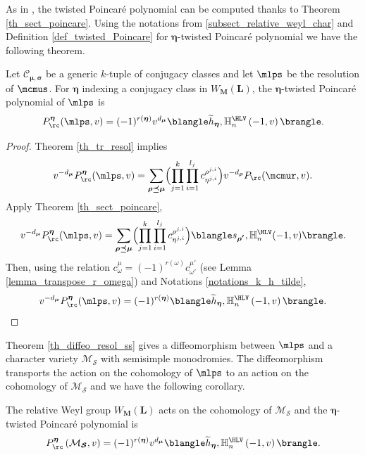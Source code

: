 As in \cite[Prop.\,1.9]{Letellier13}, the twisted Poincaré polynomial can be computed thanks to Theorem \ref{th_sect_poincare}. Using the notations from \ref{subsect_relative_weyl_char} and Definition \ref{def_twisted_Poincare} for $\boldsymbol{\eta}$-twisted Poincaré polynomial we have the following theorem.
\begin{theorem}\label{cor_twiste_Poincare_resol}
Let $\mathcal{C}_{\boldsymbol{\mu},\boldsymbol{\sigma}}$ be a generic $k$-tuple of conjugacy classes and let $\mlps$ be the resolution of $\mcmus$. For $\boldsymbol{\eta}$ indexing a conjugacy class in $W_{\boldsymbol{M}}(\boldsymbol{L})$, the $\boldsymbol{\eta}$-twisted Poincaré polynomial of $\mlps$ is
\[
P_{\rc}^{\boldsymbol{\eta}}(\mlps,v) = (-1)^{r(\boldsymbol{\eta})}v^{d_{\boldsymbol{\mu}}}\blangle \widetilde{h}_{\boldsymbol{\eta}},\mathbb{H}_n^{\HLV}\left(-1,v\right)\brangle.
\]
\end{theorem}
\begin{proof}
Theorem \ref{th_tr_resol} implies
\[
v^{-d_{\boldsymbol{\mu}}} P_{\rc}^{\boldsymbol{\eta}}(\mlps,v) = \sum_{\boldsymbol{\rho\preceq\mu}} \Bigl(\prod_{j=1}^k\prod_{i=1}^{l_j} c^{\rho^{j,i}}_{\eta^{j,i}}\Bigr) v^{-d_{\boldsymbol{\rho}}} P_{\rc}(\mcmur,v).
\]
Apply Theorem \ref{th_sect_poincare},
\begin{align*}
v^{-d_{\boldsymbol{\mu}}} P_{\rc}^{\boldsymbol{\eta}}(\mlps,v) = \sum_{\boldsymbol{\rho\preceq\mu}} \Bigl(\prod_{j=1}^k\prod_{i=1}^{l_j} c^{\rho^{j,i}}_{\eta^{j,i}}\Bigr)\blangle s_{\boldsymbol{\rho'}}, \mathbb{H}_n^{\HLV}(-1,v)\brangle.
\end{align*}
Then, using the relation $c_{\omega}^{\mu}=(-1)^{r(\omega)} c_{\omega'}^{\mu'}$ (see Lemma \ref{lemma_transpose_r_omega}) and Notations \ref{notations_k_h_tilde},
\[
v^{-d_{\boldsymbol{\mu}}} P_{\rc}^{\boldsymbol{\eta}}(\mlps,v) = (-1)^{r(\boldsymbol{\eta})}\blangle \widetilde{h}_{\boldsymbol{\eta}},\mathbb{H}_n^{\HLV}\left(-1,v\right)\brangle.\qedhere
\]
\end{proof}

Theorem \ref{th_diffeo_resol_ss} gives a diffeomorphism between $\mlps$ and a character variety $\mathcal{M}_{\boldsymbol{\mathcal{S}}}$ with semisimple monodromies. The diffeomorphism transports the action on the cohomology of $\mlps$ to an action on the cohomology of $\mathcal{M}_{\boldsymbol{\mathcal{S}}}$ and we have the following corollary.
\begin{corollary}
The relative Weyl group $W_{\boldsymbol{M}}(\boldsymbol{L})$ acts on the cohomology of $\mathcal{M}_{\boldsymbol{\mathcal{S}}}$ and the $\boldsymbol{\eta}$-twisted Poincaré polynomial is
\[
P_{\rc}^{\boldsymbol{\eta}}\left(\mathcal{M}_{\boldsymbol{\mathcal{S}}},v\right) = (-1)^{r(\boldsymbol{\eta})}v^{d_{\boldsymbol{\mu}}}\blangle \widetilde{h}_{\boldsymbol{\eta}},\mathbb{H}_n^{\HLV}\left(-1,v\right)\brangle.
\]
\end{corollary}

\Changelback
